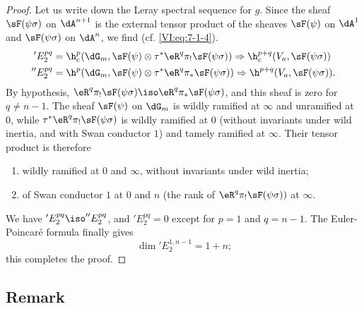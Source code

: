 \begin{proof}[Proof]
Let us write down the Leray spectral sequence for $g$. Since the sheaf $\sF(\psi\sigma)$ on 
$\dA^{n+1}$ is the external tensor product of the sheaves $\sF(\psi)$ on 
$\dA^1$ and $\sF(\psi\sigma)$ on $\dA^n$, we find (cf. \eqref{VI:eq:7-1-4}). 
\begin{align*}
  'E_2^{p q} &= \h_c^p(\dG_m,\sF(\psi)\otimes \tau^\ast \eR^q \pi_! \sF(\psi\sigma)) \Rightarrow \h_c^{p+q}(V_a,\sF(\psi\sigma)) \\
  ''E_2^{p q} &= \h^p(\dG_m,\sF(\psi)\otimes \tau^\ast \eR^q \pi_\ast \sF(\psi\sigma)) \Rightarrow \h^{p+q}(V_a,\sF(\psi\sigma)) \text{.} 
\end{align*}
By hypothesis, 
$\eR^q \pi_! \sF(\psi\sigma) \iso \eR^q \pi_\ast \sF(\psi\sigma)$, and this 
sheaf is zero for $q\ne n-1$. The sheaf $\sF(\psi)$ on $\dG_m$ is 
wildly ramified at $\infty$ and unramified at $0$, while 
$\tau^\ast \eR^q \pi_! \sF(\psi\sigma)$ is wildly ramified at $0$ (without 
invariants under wild inertia, and with Swan conductor $1$) and tamely 
ramified at $\infty$. Their tensor product is therefore 
\begin{enumerate}[\indent a)]
  \item wildly ramified at $0$ and $\infty$, without invariants under wild 
    inertia; 
  \item of Swan conductor $1$ at $0$ and $n$ (the rank of 
    $\eR^q \pi_! \sF(\psi\sigma))$ at $\infty$. 
\end{enumerate}
We have $'E_2^{p q} \iso ''E_2^{p q}$, and $'E_2^{p q}=0$ except for $p=1$ and 
$q=n-1$. The Euler-Poincaré formula finally gives 
\[
  \dim{'E_2^{1,n-1}} = 1+n \text{;} 
\]
this completes the proof. 
\end{proof}





\subsection{Remark}\label{VI:7-15}

